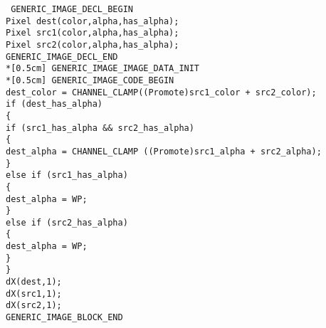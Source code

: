 \documentclass{foils}
\newcommand{\ctitle}[1]{\begin{center}{\color{headingcolor}\Huge #1}\end{center}
}
\newcommand{\nfoil}[1]{\foilhead[-.6in]{ \ctitle{#1}\vspace*{60pt}}}
\begin{document}
{\nfoil{Example}
\begin{flushleft}
\tt
\small
GENERIC\_IMAGE\_DECL\_BEGIN\\
Pixel dest(color,alpha,has\_alpha);\\
Pixel src1(color,alpha,has\_alpha);\\
Pixel src2(color,alpha,has\_alpha);\\
GENERIC\_IMAGE\_DECL\_END\\*[0.5cm]
GENERIC\_IMAGE\_IMAGE\_DATA\_INIT\\*[0.5cm]
GENERIC\_IMAGE\_CODE\_BEGIN\\
dest\_color = CHANNEL\_CLAMP((Promote)src1\_color + src2\_color);\\
if (dest\_has\_alpha)\\
\hspace*{.4cm} \{\\
\hspace*{.8cm} if (src1\_has\_alpha \&\& src2\_has\_alpha)\\
\hspace*{1.2cm} \{\\
\hspace*{1.6cm} dest\_alpha = CHANNEL\_CLAMP ((Promote)src1\_alpha + src2\_alpha);\\
\hspace*{1.2cm} \}\\
\hspace*{.8cm} else if (src1\_has\_alpha)\\
\hspace*{1.2cm} \{\\
\hspace*{1.6cm} dest\_alpha = WP;\\
\hspace*{1.2cm} \}\\
\hspace*{.8cm} else if (src2\_has\_alpha)\\
\hspace*{1.2cm} \{\\
\hspace*{1.6cm} dest\_alpha = WP;\\
\hspace*{1.2cm} \}\\
\hspace*{.8cm} \}\\
dX(dest,1);\\
dX(src1,1);\\
dX(src2,1);\\
GENERIC\_IMAGE\_BLOCK\_END\\
\end{flushleft}

}
\end{document}
